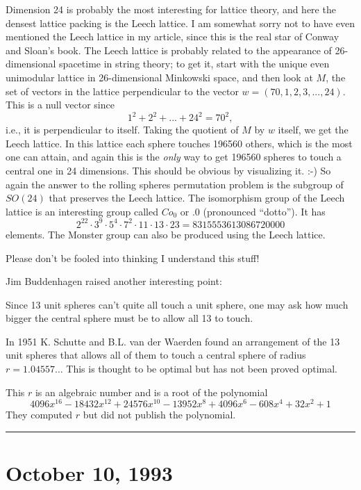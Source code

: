 \documentclass{article}
\begin{document}
Dimension 24 is probably the most interesting for lattice theory, and
here the densest lattice packing is the Leech lattice. I am somewhat
sorry not to have even mentioned the Leech lattice in my article, since
this is the real star of Conway and Sloan's book. The Leech lattice is
probably related to the appearance of 26-dimensional spacetime in string
theory; to get it, start with the unique even unimodular lattice in
26-dimensional Minkowski space, and then look at \(M\), the set of
vectors in the lattice perpendicular to the vector
\(w = (70,1,2,3,...,24)\). This is a null vector since
\[1^2 + 2^2 + ... + 24^2 = 70^2,\] i.e., it is perpendicular to itself.
Taking the quotient of \(M\) by \(w\) itself, we get the Leech lattice.
In this lattice each sphere touches 196560 others, which is the most one
can attain, and again this is the \emph{only} way to get 196560 spheres
to touch a central one in 24 dimensions. This should be obvious by
visualizing it. :-) So again the answer to the rolling spheres
permutation problem is the subgroup of \(SO(24)\) that preserves the
Leech lattice. The isomorphism group of the Leech lattice is an
interesting group called \(Co_0\) or \(.0\) (pronounced ``dotto''). It
has
\[2^{22}\cdot 3^9\cdot 5^4\cdot 7^2\cdot 11\cdot 13\cdot 23 = 8315553613086720000\]
elements. The Monster group can also be produced using the Leech
lattice.

Please don't be fooled into thinking I understand this stuff!

Jim Buddenhagen raised another interesting point:

Since 13 unit spheres can't quite all touch a unit sphere, one may ask
how much bigger the central sphere must be to allow all 13 to touch.

In 1951 K. Schutte and B.L. van der Waerden found an arrangement of the
13 unit spheres that allows all of them to touch a central sphere of
radius \(r=1.04557\ldots\) This is thought to be optimal but has not
been proved optimal.

This \(r\) is an algebraic number and is a root of the polynomial
\[4096 x^{16} -18432 x^{12} +24576 x^{10} -13952 x^8 +4096 x^6 -608x^4 +32 x^2 +1\]
They computed \(r\) but did not publish the polynomial.

\begin{center}\rule{0.5\linewidth}{0.5pt}\end{center}
\hypertarget{week21}{%
\section{October 10, 1993}\label{week21}}
\end{document}
